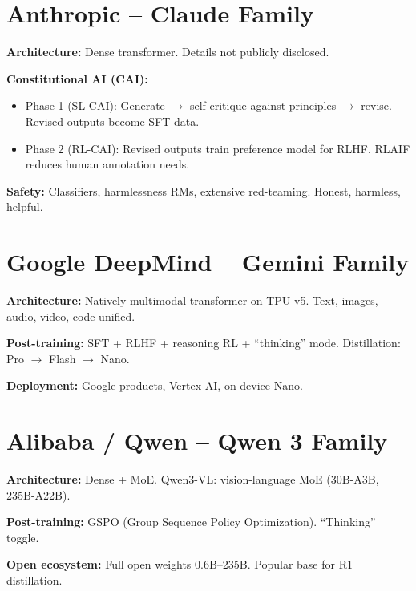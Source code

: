 \section{Anthropic -- Claude Family}

\begin{companybox}
\textbf{Architecture:} Dense transformer. Details not publicly disclosed.

\textbf{Constitutional AI (CAI):}
\begin{itemize}[leftmargin=*]
  \item Phase 1 (SL-CAI): Generate $\rightarrow$ self-critique against principles $\rightarrow$ revise. Revised outputs become SFT data.
  \item Phase 2 (RL-CAI): Revised outputs train preference model for RLHF. RLAIF reduces human annotation needs.
\end{itemize}

\textbf{Safety:} Classifiers, harmlessness RMs, extensive red-teaming. Honest, harmless, helpful.
\end{companybox}

\section{Google DeepMind -- Gemini Family}

\begin{companybox}
\textbf{Architecture:} Natively multimodal transformer on TPU v5. Text, images, audio, video, code unified.

\textbf{Post-training:} SFT + RLHF + reasoning RL + ``thinking'' mode. Distillation: Pro $\rightarrow$ Flash $\rightarrow$ Nano.

\textbf{Deployment:} Google products, Vertex AI, on-device Nano.
\end{companybox}

\section{Alibaba / Qwen -- Qwen 3 Family}

\begin{companybox}
\textbf{Architecture:} Dense + MoE. Qwen3-VL: vision-language MoE (30B-A3B, 235B-A22B).

\textbf{Post-training:} GSPO (Group Sequence Policy Optimization). ``Thinking'' toggle.

\textbf{Open ecosystem:} Full open weights 0.6B--235B. Popular base for R1 distillation.
\end{companybox}

